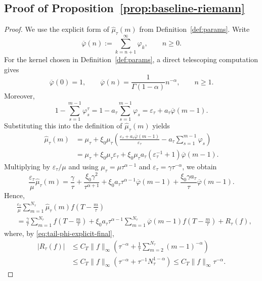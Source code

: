 \documentclass[letterpaper]{article}
\numberwithin{equation}{section}
\theoremstyle{definition}
\theoremstyle{remark}
\begin{document}
\subsection{Proof of Proposition~\ref{prop:baseline-riemann}}\label{app:baseline-riemann}

\begin{proof}
We use the explicit form of $\hat\mu_\tau(m)$ from Definition~\ref{def:params}. Write
\[
  \overline\varphi(n):=\sum_{k=n+1}^{\infty}\varphi_k,\qquad n\ge0.
\]
For the kernel chosen in Definition~\ref{def:params}, a direct telescoping computation gives
\begin{equation}\label{eq:tail-phi-explicit-final}
  \overline\varphi(0)=1,
  \qquad
  \overline\varphi(n)=\frac{1}{\Gamma(1-\alpha)}n^{-\alpha},
  \qquad n\ge1.
\end{equation}
Moreover,
\[
  1-\sum_{s=1}^{m-1}\varphi_s^\tau
  =1-a_\tau\sum_{s=1}^{m-1}\varphi_s
  =\varepsilon_\tau+a_\tau\overline\varphi(m-1).
\]
Substituting this into the definition of $\hat\mu_\tau(m)$ yields
\begin{align}
  \hat\mu_\tau(m)
  &=\mu_\tau+\xi_0\mu_\tau\left(
      \frac{\varepsilon_\tau+a_\tau\overline\varphi(m-1)}{\varepsilon_\tau}
      -a_\tau\sum_{s=1}^{m-1}\varphi_s
    \right)
  \nonumber\\
  &=\mu_\tau
    +\xi_0\mu_\tau\varepsilon_\tau
    +\xi_0\mu_\tau a_\tau\left(\varepsilon_\tau^{-1}+1\right)\overline\varphi(m-1).
  \label{eq:muhat-decomp-final}
\end{align}
Multiplying by $\varepsilon_\tau/\mu$ and using $\mu_\tau=\mu\tau^{\alpha-1}$ and $\varepsilon_\tau=\gamma\tau^{-\alpha}$, we obtain
\begin{equation}\label{eq:muhat-scaled-decomp-final}
  \frac{\varepsilon_\tau}{\mu}\hat\mu_\tau(m)
  = \frac{\gamma}{\tau}
    + \frac{\xi_0\gamma^2}{\tau^{\alpha+1}}
    + \xi_0 a_\tau\tau^{\alpha-1}\overline\varphi(m-1)
    + \frac{\xi_0\gamma a_\tau}{\tau}\overline\varphi(m-1).
\end{equation}
Hence,
\begin{align}
  &\frac{\varepsilon_\tau}{\mu}
    \sum_{m=1}^{N_\tau}\hat\mu_\tau(m)
    f\!\left(T-\frac{m}{\tau}\right)
  \nonumber\\
  &=
    \frac{\gamma}{\tau}
    \sum_{m=1}^{N_\tau}f\!\left(T-\frac{m}{\tau}\right)
    +
    \xi_0 a_\tau\tau^{\alpha-1}
    \sum_{m=1}^{N_\tau}\overline\varphi(m-1)
    f\!\left(T-\frac{m}{\tau}\right)
    +R_\tau(f),
  \label{eq:baseline-split-final}
\end{align}
where, by \eqref{eq:tail-phi-explicit-final},
\begin{align}
  |R_\tau(f)|
  &\le C_T\|f\|_{\infty}
  \left(
    \tau^{-\alpha}
    +
    \frac1\tau\sum_{m=2}^{N_\tau}(m-1)^{-\alpha}
  \right)
  \nonumber\\
  &\le C_T\|f\|_{\infty}
  \left(
    \tau^{-\alpha}
    +\tau^{-1}N_\tau^{1-\alpha}
  \right)
  \le C_T\|f\|_{\infty}\tau^{-\alpha}.
  \label{eq:Rtau-bound-final}
\end{align}


\end{proof}
\end{document}
